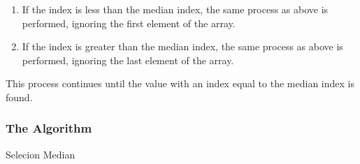 \documentclass{article}
\begin{document}
        \begin{enumerate}
            \item If the index is less than the median index, the same process as above is performed, ignoring the first element of the array.
            \item If the index is greater than the median index, the same process as above is performed, ignoring the last element of the array.
        \end{enumerate}

        This process continues until the value with an index equal to the median index is found.

        \subsubsection{The Algorithm}
            \begin{algorithm}[H]
                \caption{Selecion Median}
                \begin{algorithmic}[1]
                    \Function{Median}{$A[0..n - 1$}
                        \Else
                        \EndIf
                    \EndFunction\\

                        \EndIf
                        \EndIf
                        \EndIf
                    \EndFunction\\


                            \EndIf
                        \EndFor
                    \EndFunction
                \end{algorithmic}
            \end{algorithm}
\end{document}
